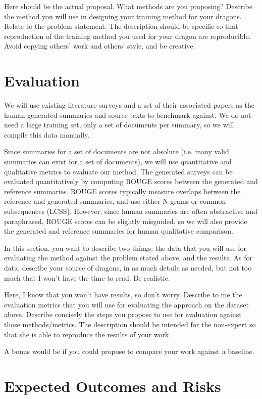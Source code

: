 \documentclass[conference]{sig-alternate-05-2015}
\begin{document}
Here should be the actual proposal. What methods are you proposing? Describe the method you will use in designing your training method for your dragons. Relate to the problem statement. The description should be specific so that reproduction of the training method you used for your dragon are reproducible. Avoid copying others' work and others' style, and be creative. 

\section{Evaluation}\label{sec:evaluation}

We will use existing literature surveys and a set of their associated papers as the human-generated 
summaries and source texts to benchmark against. We do not need a large training set, only a set of documents per summary, 
so we will compile this data manually.

Since summaries for a set of documents are not absolute (i.e. many valid summaries can exist for a set of documents), 
we will use quantitative and qualitative metrics to evaluate our method. The generated surveys can be evaluated quantitatively 
by computing ROUGE \cite{rouge} scores between the generated and reference summaries. ROUGE scores typically measure 
overlaps between the reference and generated summaries, and use either N-grams or common subsequences (LCSS). However, 
since human summaries are often abstractive and paraphrased, ROUGE scores can be slightly misguided, so we will also 
provide the generated and reference summaries for human qualitative comparison.

In this section, you want to describe two things: the data that you will use for evaluating the method against the problem stated above, and the results. As for data, describe your source of dragons, in as much details as needed, but not too much that I won't have the time to read. Be realistic. 

Here, I know that you won't have results, so don't worry. Describe to me the evaluation metrics that you will use for evaluating the approach on the dataset above. Describe concisely the steps you propose to use for evaluation against those methods/metrics. The description should be intended for the non-expert so that she is able to reproduce the results of your work. 

A bonus would be if you could propose to compare your work against a baseline. 

\section{Expected Outcomes and Risks}
\end{document}
